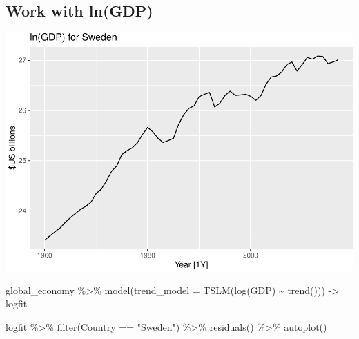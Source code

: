 \documentclass[
]{book}
\newenvironment{Shaded}{\begin{snugshade}}{\end{snugshade}}
\newcommand{\AttributeTok}[1]{\textcolor[rgb]{0.77,0.63,0.00}{#1}}
\newcommand{\FunctionTok}[1]{\textcolor[rgb]{0.00,0.00,0.00}{#1}}
\newcommand{\NormalTok}[1]{#1}
\newcommand{\OtherTok}[1]{\textcolor[rgb]{0.56,0.35,0.01}{#1}}
\newcommand{\SpecialCharTok}[1]{\textcolor[rgb]{0.00,0.00,0.00}{#1}}
\newcommand{\StringTok}[1]{\textcolor[rgb]{0.31,0.60,0.02}{#1}}
\begin{document}
\hypertarget{work-with-lngdp-1}{%
\subsection{Work with ln(GDP)}\label{work-with-lngdp-1}}

\begin{Shaded}
\end{Shaded}

\includegraphics{graphics/unnamed-chunk-65-1.pdf}

\begin{Shaded}
\begin{Highlighting}[]
\NormalTok{global\_economy }\SpecialCharTok{\%\textgreater{}\%}
  \FunctionTok{model}\NormalTok{(}\AttributeTok{trend\_model =} \FunctionTok{TSLM}\NormalTok{(}\FunctionTok{log}\NormalTok{(GDP) }\SpecialCharTok{\textasciitilde{}} \FunctionTok{trend}\NormalTok{())) }\OtherTok{{-}\textgreater{}}\NormalTok{ logfit}
\end{Highlighting}
\end{Shaded}

\begin{Shaded}
\begin{Highlighting}[]
\NormalTok{logfit }\SpecialCharTok{\%\textgreater{}\%} \FunctionTok{filter}\NormalTok{(Country }\SpecialCharTok{==} \StringTok{"Sweden"}\NormalTok{) }\SpecialCharTok{\%\textgreater{}\%} \FunctionTok{residuals}\NormalTok{() }\SpecialCharTok{\%\textgreater{}\%} \FunctionTok{autoplot}\NormalTok{()}
\end{Highlighting}
\end{Shaded}
\end{document}
